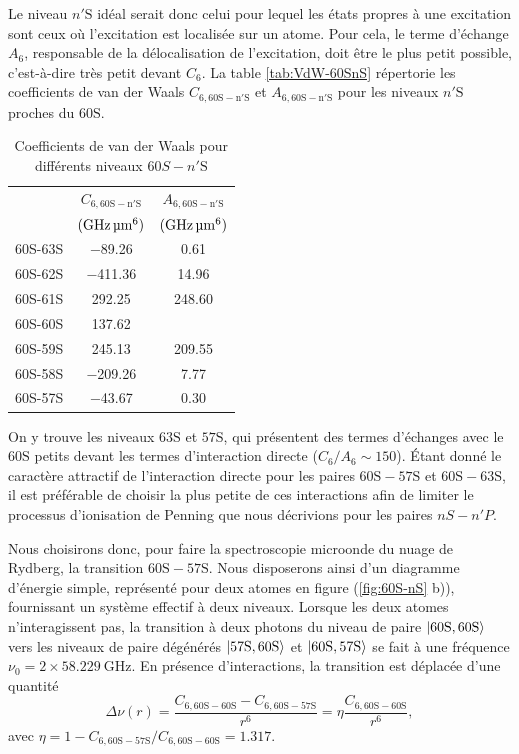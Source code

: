 Le niveau $n'\mathrm{S}$ idéal serait donc celui pour lequel les états propres à une excitation sont ceux où l'excitation est localisée sur un atome.
Pour cela, le terme d'échange $A_6$, responsable de la délocalisation de l'excitation, doit être le plus petit possible, c'est-à-dire très petit devant $C_6$.
La table \eqref{tab:VdW-60SnS} répertorie les coefficients de van der Waals $C_{6,\mathrm{60S-n'S}}$ et $A_{6,\mathrm{60S-n'S}}$ pour les niveaux $n'\mathrm{S}$ proches du $\mathrm{60S}$.
%
\begin{table}[!h]
	\centering
	\caption[Coefficients de van der Waals pour différents niveaux $60S-n'\mathrm{S}$]{Coefficients de van der Waals pour différents niveaux $60S-n'\mathrm{S}$
	}
	\label{tab:VdW-60SnS}
	\begin{tabular}{c c c}
		\toprule\midrule
		~
		& $C_{6,\mathrm{60S-n'S}}$
		& $A_{6,\mathrm{60S-n'S}}$\\		
		~
		& $(\si{\GHz\raiseto{6}\um})$
		& $(\si{\GHz\raiseto{6}\um})$\\
		\midrule
		60S-63S & \SI{-89.26}{} & \SI{0.61}{} \\
		60S-62S & \SI{-411.36}{} & \SI{14.96}{} \\
		60S-61S & \SI{292.25}{} & \SI{248.60}{} \\
		60S-60S & \SI{137.62}{} & \SI{}{} \\
		60S-59S & \SI{245.13}{} & \SI{209.55}{} \\
		60S-58S & \SI{-209.26}{} & \SI{7.77}{} \\
		60S-57S & \SI{-43.67}{} & \SI{0.30}{} \\
		\midrule
		\bottomrule
 	\end{tabular}
\end{table}
%
On y trouve les niveaux $\mathrm{63S}$ et $\mathrm{57S}$, qui présentent des termes d'échanges avec le $\mathrm{60S}$ petits devant les termes d'interaction directe ($C_6 / A_6 \sim 150$).
Étant donné le caractère attractif de l'interaction directe pour les paires $\mathrm{60S-57S}$ et $\mathrm{60S-63S}$, il est préférable de choisir la plus petite de ces interactions afin de limiter le processus d'ionisation de Penning que nous décrivions pour les paires $nS-n'P$.

Nous choisirons donc, pour faire la spectroscopie microonde du nuage de Rydberg, la transition $\mathrm{60S-57S}$.
Nous disposerons ainsi d'un diagramme d'énergie simple, représenté pour deux atomes en figure (\ref{fig:60S-nS} b)), fournissant un système effectif à deux niveaux.
Lorsque les deux atomes n'interagissent pas, la transition à deux photons du niveau de paire $\ket{\mathrm{60S,60S}}$ vers les niveaux de paire dégénérés $\ket{\mathrm{57S,60S}}$ et $\ket{\mathrm{60S,57S}}$ se fait à une fréquence $\nu_0 = 2\times \SI{58.229}{\GHz}$.
En présence d'interactions, la transition est déplacée d'une quantité
\begin{equation}
\label{eq:60s-57s_2atoms}
\Delta\nu (r) = \frac{C_{6,\mathrm{60S-60S}}-C_{6,\mathrm{60S-57S}}}{r^6} = \eta \frac{C_{6,\mathrm{60S-60S}}}{r^6},
\end{equation}
avec $\eta = 1-C_{6,\mathrm{60S-57S}}/C_{6,\mathrm{60S-60S}} = \num{1.317}$.

